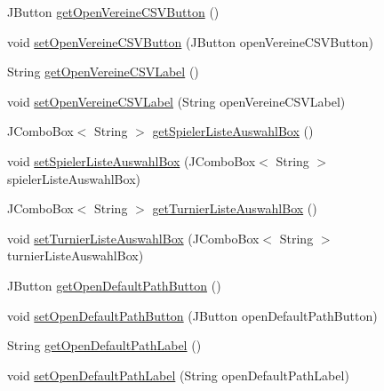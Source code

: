 \begin{DoxyCompactItemize}
J\+Button \hyperlink{classde_1_1turnierverwaltung_1_1view_1_1_settings_view_a93f8f76297d2a97d6cd5b9fda55e808e}{get\+Open\+Vereine\+C\+S\+V\+Button} ()
\item 
void \hyperlink{classde_1_1turnierverwaltung_1_1view_1_1_settings_view_a83654fe4a649cdf045ffc22bb17f660f}{set\+Open\+Vereine\+C\+S\+V\+Button} (J\+Button open\+Vereine\+C\+S\+V\+Button)
\item 
String \hyperlink{classde_1_1turnierverwaltung_1_1view_1_1_settings_view_af930ad49daa835ca4f6f4b9111cd92af}{get\+Open\+Vereine\+C\+S\+V\+Label} ()
\item 
void \hyperlink{classde_1_1turnierverwaltung_1_1view_1_1_settings_view_acf8fb814df9afa20fc29a55369559f29}{set\+Open\+Vereine\+C\+S\+V\+Label} (String open\+Vereine\+C\+S\+V\+Label)
\item 
J\+Combo\+Box$<$ String $>$ \hyperlink{classde_1_1turnierverwaltung_1_1view_1_1_settings_view_a1b1978396af89ce1b72608dd630eda95}{get\+Spieler\+Liste\+Auswahl\+Box} ()
\item 
void \hyperlink{classde_1_1turnierverwaltung_1_1view_1_1_settings_view_a3b6409b0eddff251bb4f4f1b8e05e646}{set\+Spieler\+Liste\+Auswahl\+Box} (J\+Combo\+Box$<$ String $>$ spieler\+Liste\+Auswahl\+Box)
\item 
J\+Combo\+Box$<$ String $>$ \hyperlink{classde_1_1turnierverwaltung_1_1view_1_1_settings_view_a36450b0380c4073caa8b75c1c451c642}{get\+Turnier\+Liste\+Auswahl\+Box} ()
\item 
void \hyperlink{classde_1_1turnierverwaltung_1_1view_1_1_settings_view_ae25d230aa00e41324841c44c2c06f6fd}{set\+Turnier\+Liste\+Auswahl\+Box} (J\+Combo\+Box$<$ String $>$ turnier\+Liste\+Auswahl\+Box)
\item 
J\+Button \hyperlink{classde_1_1turnierverwaltung_1_1view_1_1_settings_view_af594ea2f922703d4b10376bb2bd6072a}{get\+Open\+Default\+Path\+Button} ()
\item 
void \hyperlink{classde_1_1turnierverwaltung_1_1view_1_1_settings_view_a64947b50e805481556cddedce1963d39}{set\+Open\+Default\+Path\+Button} (J\+Button open\+Default\+Path\+Button)
\item 
String \hyperlink{classde_1_1turnierverwaltung_1_1view_1_1_settings_view_a2e6206e588789519bc1cd58737ee7916}{get\+Open\+Default\+Path\+Label} ()
\item 
void \hyperlink{classde_1_1turnierverwaltung_1_1view_1_1_settings_view_ab0190cc57b500e2ee81776663b161f12}{set\+Open\+Default\+Path\+Label} (String open\+Default\+Path\+Label)
\item 

\end{DoxyCompactItemize}
